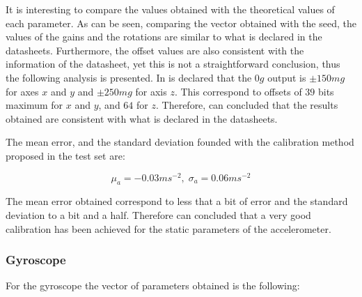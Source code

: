 \documentclass[conference]{IEEEtran}
\newcommand{\refp}[1]{(\ref{#1})}
\begin{document}
It is interesting to compare the values obtained with the theoretical values of each parameter. As can be seen, comparing the vector obtained with the seed, the values of the gains and the rotations are similar to what is declared in the datasheets. Furthermore, the offset values are also consistent with the information of the datasheet, yet this is not a straightforward conclusion, thus the following analysis is presented. In \cite{bib:acc_data} is declared that the $0g$ output is $\pm 150 mg$ for axes $x$ and $y$ and $\pm 250mg$ for axis $z$. This correspond to offsets of $39$ bits maximum for $x$ and $y$, and $64$ for $z$. Therefore, can concluded that the results obtained are consistent with what is declared in the datasheets. 

The mean error, and the standard deviation founded with the calibration method proposed in the test set are:

\begin{equation}
\mu_a = -0.03ms^{-2}, \; \sigma_a = 0.06ms^{-2}
\end{equation}

The mean error obtained correspond to less that a bit of error and the standard deviation to a bit and a half. Therefore can concluded that a very good calibration has been achieved for the static parameters of the accelerometer.\\



\subsubsection{Gyroscope}
For the gyroscope the vector of parameters obtained is the following:
\end{document}
